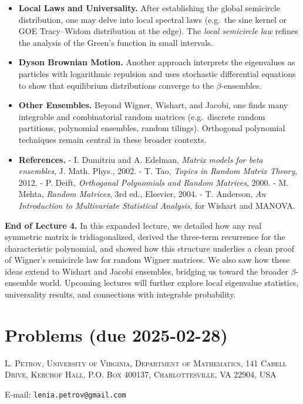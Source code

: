 \documentclass[letterpaper,11pt,oneside,reqno]{article}
\numberwithin{equation}{section}
\theoremstyle{definition}
\begin{document}
\begin{itemize}
\item {\bf Local Laws and Universality.} After establishing the global semicircle distribution, one may delve into local spectral laws (e.g.\ the sine kernel or GOE Tracy–Widom distribution at the edge). The \emph{local semicircle law} refines the analysis of the Green’s function in small intervals.
\item {\bf Dyson Brownian Motion.} Another approach interprets the eigenvalues as particles with logarithmic repulsion and uses stochastic differential equations to show that equilibrium distributions converge to the $\beta$-ensembles.
\item {\bf Other Ensembles.} Beyond Wigner, Wishart, and Jacobi, one finds many integrable and combinatorial random matrices (e.g.\ discrete random partitions, polynomial ensembles, random tilings). Orthogonal polynomial techniques remain central in these broader contexts.
\item {\bf References.}
  - I. Dumitriu and A. Edelman, \emph{Matrix models for beta ensembles}, J. Math. Phys., 2002.
  - T. Tao, \emph{Topics in Random Matrix Theory}, 2012.
  - P. Deift, \emph{Orthogonal Polynomials and Random Matrices}, 2000.
  - M. Mehta, \emph{Random Matrices}, 3rd ed., Elsevier, 2004.
  - T. Anderson, \emph{An Introduction to Multivariate Statistical Analysis}, for Wishart and MANOVA.
\end{itemize}


\bigskip
\noindent
\textbf{End of Lecture 4.} In this expanded lecture, we detailed how any real symmetric matrix is tridiagonalized, derived the three-term recurrence for the characteristic polynomial, and showed how this structure underlies a clean proof of Wigner’s semicircle law for random Wigner matrices. We also saw how these ideas extend to Wishart and Jacobi ensembles, bridging us toward the broader \(\beta\)-ensemble world. Upcoming lectures will further explore local eigenvalue statistics, universality results, and connections with integrable probability.





\appendix
\setcounter{section}{3}

\section{Problems (due 2025-02-28)}









\medskip

\textsc{L. Petrov, University of Virginia, Department of Mathematics, 141 Cabell Drive, Kerchof Hall, P.O. Box 400137, Charlottesville, VA 22904, USA}

E-mail: \texttt{lenia.petrov@gmail.com}
\end{document}
